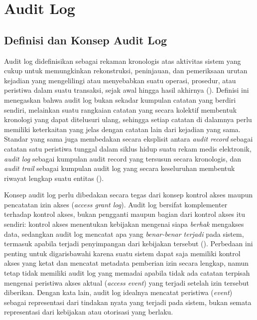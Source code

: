 \section{Audit Log}
\label{sec:audit-trail}

\subsection{Definisi dan Konsep Audit Log}
\label{subsec:definisi-audit-trail}

Audit log didefinisikan sebagai rekaman kronologis atas aktivitas sistem yang cukup untuk memungkinkan rekonstruksi, peninjauan, dan pemeriksaan urutan kejadian yang mengelilingi atau menyebabkan suatu operasi, prosedur, atau peristiwa dalam suatu transaksi, sejak awal hingga hasil akhirnya (\cite{iso27789_2021}). Definisi ini menegaskan bahwa audit log bukan sekadar kumpulan catatan yang berdiri sendiri, melainkan suatu rangkaian catatan yang secara kolektif membentuk kronologi yang dapat ditelusuri ulang, sehingga setiap catatan di dalamnya perlu memiliki keterkaitan yang jelas dengan catatan lain dari kejadian yang sama. Standar yang sama juga membedakan secara eksplisit antara \textit{audit record} sebagai catatan satu peristiwa tunggal dalam siklus hidup suatu rekam medis elektronik, \textit{audit log} sebagai kumpulan audit record yang tersusun secara kronologis, dan \textit{audit trail} sebagai kumpulan audit log yang secara keseluruhan membentuk riwayat lengkap suatu entitas (\cite{iso27789_2021}).

Konsep audit log perlu dibedakan secara tegas dari konsep kontrol akses maupun pencatatan izin akses (\textit{access grant log}). Audit log bersifat komplementer terhadap kontrol akses, bukan pengganti maupun bagian dari kontrol akses itu sendiri: kontrol akses menentukan kebijakan mengenai siapa \textit{berhak} mengakses data, sedangkan audit log mencatat apa yang \textit{benar-benar terjadi} pada sistem, termasuk apabila terjadi penyimpangan dari kebijakan tersebut (\cite{iso27789_2021}). Perbedaan ini penting untuk digarisbawahi karena suatu sistem dapat saja memiliki kontrol akses yang ketat dan mencatat metadata pemberian izin secara lengkap, namun tetap tidak memiliki audit log yang memadai apabila tidak ada catatan terpisah mengenai peristiwa akses aktual (\textit{access event}) yang terjadi setelah izin tersebut diberikan. Dengan kata lain, audit log idealnya mencatat peristiwa (\textit{event}) sebagai representasi dari tindakan nyata yang terjadi pada sistem, bukan semata representasi dari kebijakan atau otorisasi yang berlaku.

